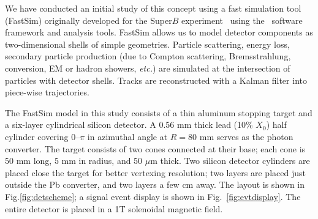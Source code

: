 We have conducted an initial study of this concept using a fast simulation
tool (FastSim) originally developed for the Super$B$ experiment~\cite{SuperB}
using the \babar\
software framework and analysis tools. FastSim allows us to model detector 
components as two-dimensional shells of simple geometries. Particle scattering,
energy loss, secondary particle production (due to Compton scattering, 
Bremsstrahlung, conversion, EM or hadron showers, {\it etc.}) are simulated at the
intersection of particles with detector shells. Tracks are reconstructed with
a Kalman filter into piece-wise trajectories.

The FastSim model in this study consists of a thin aluminum stopping target 
and a six-layer
cylindrical silicon detector. A 0.56 mm thick lead (10\% $X_0$) half cylinder 
covering 0--$\pi$ in azimuthal angle at $R = 80$ mm serves as the photon converter.
The target consists of two cones connected at their base; each cone is 50 mm 
long, 5 mm in radius, and 50 $\mu$m thick. Two silicon detector cylinders are
placed close the target for better vertexing resolution; two layers are placed
just outside the Pb converter, and two layers a few cm away. The layout is shown
in Fig.\ref{fig:detscheme}; a signal event display is shown in 
Fig.~\ref{fig:evtdisplay}. The entire detector is placed in a 1T solenoidal
magnetic field.


